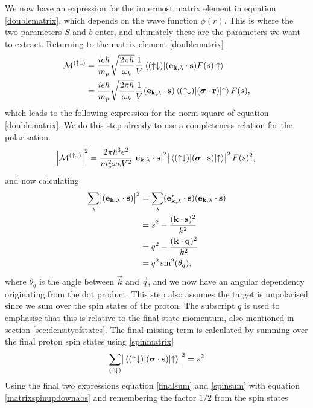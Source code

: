 We now have an expression for the innermost matrix element in equation \eqref{doublematrix}, which depends on the wave function $\phi(r)$. This is where the two parameters $S$ and $b$ enter, and ultimately these are the parameters we want to extract. Returning to the matrix element \eqref{doublematrix}
\begin{align}
	\mathcal{M^{(\uparrow\downarrow)}} &= \frac{ie\hbar}{m_p}\sqrt{\frac{2\pi \hbar}{\omega_k}}\frac{1}{V}\mel*{(\uparrow\downarrow)}{(\bm{\mathrm{e}}_{\bm{\mathrm{k}},\lambda}\cdot\bm{\mathrm{s}})F(s)}{\uparrow} \\
	&=\frac{ie\hbar}{m_p}\sqrt{\frac{2\pi \hbar}{\omega_k}}\frac{1}{V} (\bm{\mathrm{e}}_{\bm{\mathrm{k}},\lambda}\cdot\bm{\mathrm{s}})\mel*{(\uparrow\downarrow)}{(\bm{\mathrm{\sigma}}\cdot \bm{\mathrm{r}})}{\uparrow}F(s),
\end{align}
which leads to the following expression for the norm square of equation \eqref{doublematrix}. We do this step already to use a completeness relation for the polarisation.
\begin{equation} \label{matrixspinupdownabs}
	\abs{\mathcal{M}^{(\uparrow\downarrow)}}^2 = \frac{2\pi\hbar^3e^2}{m_p^2\omega_k V^2} \abs{\bm{\mathrm{e}}_{\bm{\mathrm{k}},\lambda}\cdot \bm{\mathrm{s}}}^2 \abs{\mel*{(\uparrow\downarrow)}{(\bm{\mathrm{\sigma}}\cdot \bm{\mathrm{s}})}{\uparrow}}^2 F(s)^2,
\end{equation}
and now calculating
\begin{align} \label{sumoverpol}
	\sum_\lambda \abs{(\bm{\mathrm{e}}_{\bm{\mathrm{k}},\lambda} \cdot \bm{\mathrm{s}})}^2 &= \sum_\lambda (\bm{\mathrm{e}}_{\bm{\mathrm{k}},\lambda}^*\cdot \bm{\mathrm{s}})(\bm{\mathrm{e}}_{\bm{\mathrm{k}},\lambda}\cdot\bm{\mathrm{s}}) \\
	&= s^2 -\frac{(\bm{\mathrm{k}}\cdot \bm{\mathrm{s}})^2}{k^2} \\
	&= q^2 -\frac{(\bm{\mathrm{k}}\cdot \bm{\mathrm{q}})^2}{k^2} \\
	&= q^2 \sin^2(\theta_q),\label{finalsum}
\end{align}
where $\theta_q$ is the angle between $\vec{k}$ and $\vec{q}$, and we now have an angular dependency originating from the dot product. This step also assumes the target is unpolarised since we sum over the spin states of the proton. The subscript $q$ is used to emphasise that this is relative to the final state momentum, also mentioned in section \ref{sec:densityofstates}. The final missing term is calculated by summing over the final proton spin states using \eqref{spinmatrix}
\begin{equation} \label{spinsum}
	\sum_{(\uparrow\downarrow)} \abs{\mel*{(\uparrow\downarrow)}{(\bm{\mathrm{\sigma}}\cdot\bm{\mathrm{s}})}{\uparrow}}^2 = s^2
\end{equation}
Using the final two expressions equation \eqref{finalsum} and \eqref{spinsum} with equation \eqref{matrixspinupdownabs} and remembering the factor $1/2$ from the spin states
